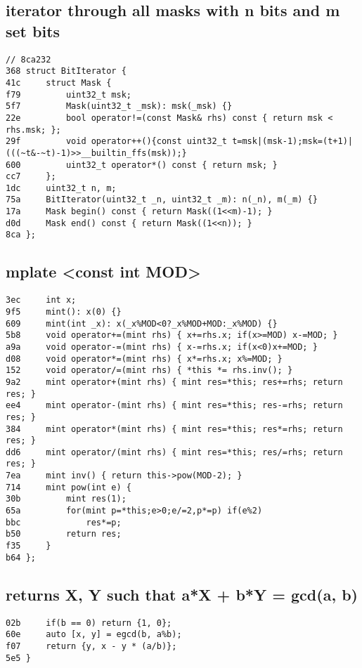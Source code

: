\documentclass[11pt, a4paper, twoside]{article}
\begin{document}
\subsection{iterator through all masks with n bits and m set bits}
\begin{lstlisting}
// 8ca232
368 struct BitIterator {
41c 	struct Mask {
f79 		uint32_t msk;
5f7 		Mask(uint32_t _msk): msk(_msk) {}
22e 		bool operator!=(const Mask& rhs) const { return msk < rhs.msk; };
29f 		void operator++(){const uint32_t t=msk|(msk-1);msk=(t+1)|(((~t&-~t)-1)>>__builtin_ffs(msk));}
600 		uint32_t operator*() const { return msk; }
cc7 	};
1dc 	uint32_t n, m;
75a 	BitIterator(uint32_t _n, uint32_t _m): n(_n), m(_m) {}
17a 	Mask begin() const { return Mask((1<<m)-1); }
d0d 	Mask end() const { return Mask((1<<n)); }
8ca };
\end{lstlisting}

\subsection{mplate <const int MOD>}
\begin{lstlisting}
3ec 	int x;
9f5 	mint(): x(0) {}
609 	mint(int _x): x(_x%MOD<0?_x%MOD+MOD:_x%MOD) {}
5b8 	void operator+=(mint rhs) { x+=rhs.x; if(x>=MOD) x-=MOD; }
a9a 	void operator-=(mint rhs) { x-=rhs.x; if(x<0)x+=MOD; }
d08 	void operator*=(mint rhs) { x*=rhs.x; x%=MOD; }
152 	void operator/=(mint rhs) { *this *= rhs.inv(); }
9a2 	mint operator+(mint rhs) { mint res=*this; res+=rhs; return res; }
ee4 	mint operator-(mint rhs) { mint res=*this; res-=rhs; return res; }
384 	mint operator*(mint rhs) { mint res=*this; res*=rhs; return res; }
dd6 	mint operator/(mint rhs) { mint res=*this; res/=rhs; return res; }
7ea 	mint inv() { return this->pow(MOD-2); }
714 	mint pow(int e) {
30b 		mint res(1);
65a 		for(mint p=*this;e>0;e/=2,p*=p) if(e%2)
bbc 			res*=p;
b50 		return res;
f35 	}
b64 };
\end{lstlisting}

\subsection{returns X, Y such that a*X + b*Y = gcd(a, b)}
\begin{lstlisting}
02b 	if(b == 0) return {1, 0};
60e 	auto [x, y] = egcd(b, a%b);
f07 	return {y, x - y * (a/b)};
5e5 }
\end{lstlisting}



%
%
\end{document}
